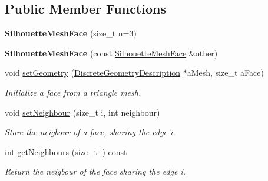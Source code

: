 \subsection*{Public Member Functions}
\begin{DoxyCompactItemize}
\item 
\mbox{\label{classvisilib_1_1_silhouette_mesh_face_a3964d6c8e62c17c8372fa69e9084889f}} 
{\bfseries Silhouette\+Mesh\+Face} (size\+\_\+t n=3)
\item 
\mbox{\label{classvisilib_1_1_silhouette_mesh_face_a7dc0c8bc6b150ecca7307eb3f0c85bcd}} 
{\bfseries Silhouette\+Mesh\+Face} (const \mbox{\hyperlink{classvisilib_1_1_silhouette_mesh_face}{Silhouette\+Mesh\+Face}} \&other)
\item 
\mbox{\label{classvisilib_1_1_silhouette_mesh_face_acb6f95afd112046d3ba4ae5bd9738e25}} 
void \mbox{\hyperlink{classvisilib_1_1_silhouette_mesh_face_acb6f95afd112046d3ba4ae5bd9738e25}{set\+Geometry}} (\mbox{\hyperlink{structvisilib_1_1_discrete_geometry_description}{Discrete\+Geometry\+Description}} $\ast$a\+Mesh, size\+\_\+t a\+Face)
\begin{DoxyCompactList}\small\item\em Initialize a face from a triangle mesh. \end{DoxyCompactList}\item 
\mbox{\label{classvisilib_1_1_silhouette_mesh_face_a481d2d1b6544e3be14c55842ee37ab0a}} 
void \mbox{\hyperlink{classvisilib_1_1_silhouette_mesh_face_a481d2d1b6544e3be14c55842ee37ab0a}{set\+Neighbour}} (size\+\_\+t i, int neighbour)
\begin{DoxyCompactList}\small\item\em Store the neigbour of a face, sharing the edge i. \end{DoxyCompactList}\item 
\mbox{\label{classvisilib_1_1_silhouette_mesh_face_aaaab9df89dcf72e9a039b1556762f0c3}} 
int \mbox{\hyperlink{classvisilib_1_1_silhouette_mesh_face_aaaab9df89dcf72e9a039b1556762f0c3}{get\+Neighbours}} (size\+\_\+t i) const
\begin{DoxyCompactList}\small\item\em Return the neigbour of the face sharing the edge i. \end{DoxyCompactList}\item 

\end{DoxyCompactItemize}
